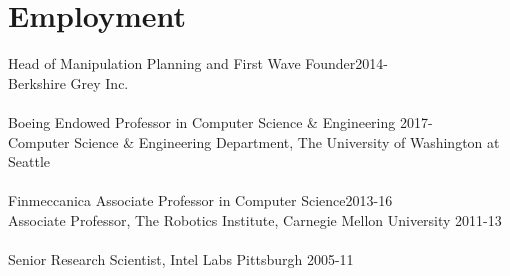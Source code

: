 
\section{Employment}
\noindent
\ifBG
Head of Manipulation Planning and First Wave Founder\hfill 2014-\\
Berkshire Grey Inc.\\
\\
\fi
Boeing Endowed Professor in Computer Science \& Engineering \hfill 2017-\\
Computer Science \& Engineering Department, 
The University of Washington at Seattle\\
\\
Finmeccanica Associate Professor in Computer Science\hfill 2013-16\\
Associate Professor, 
The Robotics Institute,  Carnegie Mellon University
\hfill 2011-13\\
\\
Senior Research Scientist, Intel Labs Pittsburgh \hfill 2005-11


